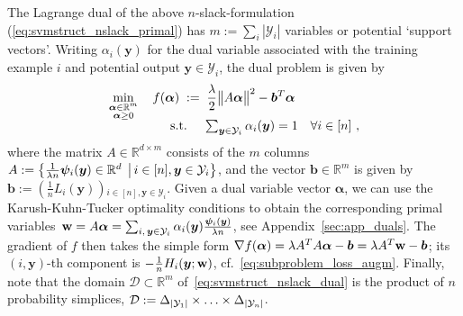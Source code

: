 \documentclass[twoside,11pt]{article}
\newcommand{\pnorm}[2]{\| {#1} \|_{#2}}
\newcommand{\norm}[1]{\pnorm{#1}{}}
\newcommand{\comment}[1]{}
\newcommand{\av}{\bm{\alpha}}
\newcommand{\wv}{{\bf w}}
\newcommand{\simplex}{\Delta}
\newcommand{\R}{\mathbb{R}}
\newcommand{\norm}[1]{\left\lVert#1\right\rVert}
\newcommand\SetOf[2]{\left\{#1\,\vphantom{#2}\right.\left|\vphantom{#1}\,#2\right\}}
\newcommand{\0}{\mathbf{0}} %
\newcommand{\bv}{\bm{b}}
\newcommand{\outputvar}{y}
\newcommand{\outputvarv}{\bm{\outputvar}}
\newcommand{\outputdomain}{\mathcal{Y}}
\newcommand{\featuremapdiff}{\psi}
\newcommand{\featuremapdiffv}{\bm{\featuremapdiff}}
\newcommand{\errorterm}{L}
\newcommand{\weight}{w}
\newcommand{\wv}{{\bm{\weight}}}
\newcommand{\dualvar}{\alpha}
\newcommand{\dualvarv}{\bm{\alpha}}
\newcommand{\domain}{\mathcal{D}} %
\begin{document}
The Lagrange dual of the above $n$-slack-formulation (\ref{eq:svmstruct_nslack_primal}) has $m := \sum_i |\outputdomain_i|$ variables or potential `support vectors'.
Writing $\dualvar_i(\outputvarv)$ for the dual variable associated with the training example $i$ and potential output $\outputvarv \in \outputdomain_i$, the dual problem is given by
\begin{align}
    \label{eq:svmstruct_nslack_dual} %
    \min_{\substack{ \dualvarv\in\R^{m} \\  \dualvarv \geq 0}} \quad  f(\dualvarv) \;:=&  \;\;
    \frac{\lambda}{2}
    \big\| A\dualvarv \big\|^2
    - \bv^T\dualvarv
    \\[-2mm]
    \text{s.t.} \quad &  \;
      \textstyle\sum_{\outputvarv \in \outputdomain_i}  \dualvar_i(\outputvarv) = 1 ~~~\forall i\in[n] \ , \notag 
\end{align}
where the matrix $A\in\R^{d\times m}$ consists of the $m$ columns $A := \SetOf{\frac1{\lambda n} \featuremapdiffv_i(\outputvarv) \in\R^d}{i\in[n],\outputvarv \in \outputdomain_i}$, and the vector $\bv \in \R^m$ is given by 
$\bv:= \left(\frac1n \errorterm_i(\outputvarv) \right)$$_{i\in[n],\outputvarv\in\outputdomain_i}$. %
Given a dual variable vector $\dualvarv$, we can use the Karush-Kuhn-Tucker optimality conditions  to obtain the corresponding primal variables~$
\wv = A\dualvarv  = \sum_{i,\,\outputvarv \in \outputdomain_i} \dualvar_i(\outputvarv)  \frac{\featuremapdiffv_i(\outputvarv)}{\lambda n}
$, see Appendix~\ref{sec:app_duals}.
The gradient of $f$ then takes the simple form $\nabla f(\dualvarv) = \lambda A^TA\dualvarv - \bv = \lambda A^T\wv - \bv$; its \mbox{$(i,\outputvarv)$-th} component is $-\frac{1}{n} H_i(\outputvarv; \wv)$, cf.~\eqref{eq:subproblem_loss_augm}. 
Finally, note that the domain $\domain \subset \R^m$ of~\eqref{eq:svmstruct_nslack_dual} is the product of $n$ probability simplices, $\domain := \simplex_{|\outputdomain_1|}\times\mathellipsis\times\simplex_{|\outputdomain_n|}$.

\comment{
This approach exploits the associated conjugate \emph{dual} problem of \eqref{eq:sdcaPrimal} defined over one dual variable per each example in
the training set.
\begin{equation}
    \label{eq:sdcaDual}
    \max_{\av \in \R^n} \quad \Big[ \ 
    D(\av) := - \frac{\lambda}{2} \norm{ A\av }^2
    - \frac1n \sum_{i=1}^n \ell_i^*(-\alpha_i) \ \Big],
\end{equation}
where $\ell_i^*$ is the conjugate (Fenchel dual) of the loss function
$\ell_i$%
, and the data matrix $A\in\R^{d\times n}$ collects the (normalized) data
examples $A_i := \frac{1}{\lambda n} X^i$ in its columns. The duality comes with the convenient mapping from dual to primal variables
$\wv(\av) := A\av$ as given by the optimality
conditions~\cite{ShalevShwartz:2013wl}.
For any configuration of the dual variables $\av$, we have the duality gap
defined as $P(\wv(\av)) - D(\av)$. This gap is a computable certificate of
the approximation quality to the unknown true optimum $P(\wv^*) = D(\av^*)$,
and therefore serves as a useful stopping criteria as well as a way to automatically set the stepsize. We refer the reader to~\cite{Jaggi:2014vi} for further details.
}
\end{document}
